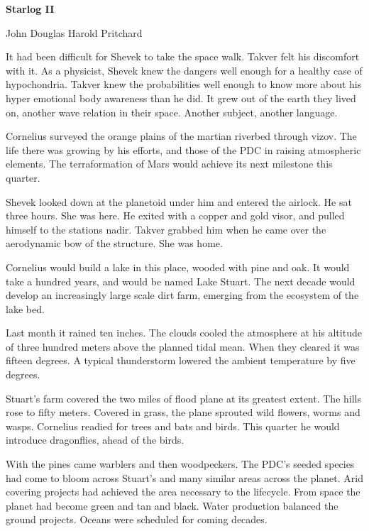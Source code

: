 


\centerline{\bf Starlog II}

\smallskip

\centerline{John Douglas Harold Pritchard}

\break



It had been difficult for Shevek to take the space walk.  Takver felt
his discomfort with it.  As a physicist, Shevek knew the dangers well
enough for a healthy case of hypochondria.  Takver knew the
probabilities well enough to know more about his hyper emotional body
awareness than he did.  It grew out of the earth they lived on,
another wave relation in their space.  Another subject, another
language.

\bigskip

Cornelius surveyed the orange plains of the martian riverbed through
vizov.  The life there was growing by his efforts, and those of the
PDC in raising atmospheric elements.  The terraformation of Mars would
achieve its next milestone this quarter.

\bigskip

Shevek looked down at the planetoid under him and entered the airlock.
He sat three hours.  She was here.  He exited with a copper and gold
visor, and pulled himself to the stations nadir.  Takver grabbed him
when he came over the aerodynamic bow of the structure.  She was home.

\bigskip

Cornelius would build a lake in this place, wooded with pine and oak.
It would take a hundred years, and would be named Lake Stuart.  The
next decade would develop an increasingly large scale dirt farm,
emerging from the ecosystem of the lake bed.

Last month it rained ten inches.  The clouds cooled the atmosphere at
his altitude of three hundred meters above the planned tidal mean.
When they cleared it was fifteen degrees.  A typical thunderstorm
lowered the ambient temperature by five degrees.

Stuart's farm covered the two miles of flood plane at its greatest
extent.  The hills rose to fifty meters.  Covered in grass, the plane
sprouted wild flowers, worms and wasps.  Cornelius readied for trees
and bats and birds.  This quarter he would introduce dragonflies,
ahead of the birds.

With the pines came warblers and then woodpeckers.  The PDC's seeded
species had come to bloom across Stuart's and many similar areas
across the planet.  Arid covering projects had achieved the area
necessary to the lifecycle.  From space the planet had become green
and tan and black.  Water production balanced the ground projects.
Oceans were scheduled for coming decades.


